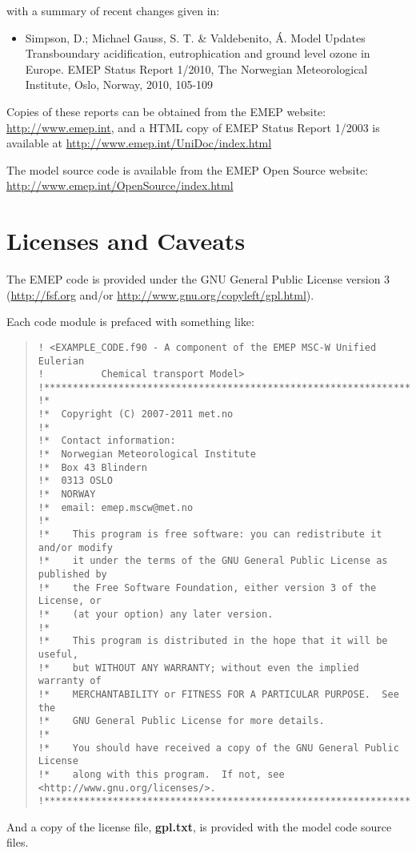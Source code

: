 with a summary of recent changes given in:
\begin{itemize}
\item
Simpson, D.; Michael Gauss, S. T. \& Valdebenito, \'A. Model Updates Transboundary acidification, eutrophication and ground level ozone in Europe. EMEP Status Report 1/2010, The Norwegian Meteorological Institute, Oslo, Norway, 2010, 105-109
\end{itemize}


 Copies of these reports can be obtained from the EMEP website: \\
\url{http://www.emep.int}, and a HTML copy of EMEP Status Report
1/2003 is
available at 
\url{http://www.emep.int/UniDoc/index.html}

The model source code is available from the  EMEP Open Source
  website:\\ \url{http://www.emep.int/OpenSource/index.html}

\newpage

\section{Licenses and Caveats}

The EMEP code is provided under the GNU General Public License version 3
(\url{http://fsf.org} and/or
\url{http://www.gnu.org/copyleft/gpl.html}).

Each code module is prefaced with something like:
\begin{quote}
\begin{small}
\begin{verbatim}
! <EXAMPLE_CODE.f90 - A component of the EMEP MSC-W Unified Eulerian
!          Chemical transport Model>
!*****************************************************************************!
!*
!*  Copyright (C) 2007-2011 met.no
!*
!*  Contact information:
!*  Norwegian Meteorological Institute
!*  Box 43 Blindern
!*  0313 OSLO
!*  NORWAY
!*  email: emep.mscw@met.no
!*
!*    This program is free software: you can redistribute it and/or modify
!*    it under the terms of the GNU General Public License as published by
!*    the Free Software Foundation, either version 3 of the License, or
!*    (at your option) any later version.
!*
!*    This program is distributed in the hope that it will be useful,
!*    but WITHOUT ANY WARRANTY; without even the implied warranty of
!*    MERCHANTABILITY or FITNESS FOR A PARTICULAR PURPOSE.  See the
!*    GNU General Public License for more details.
!*
!*    You should have received a copy of the GNU General Public License
!*    along with this program.  If not, see <http://www.gnu.org/licenses/>.
!*****************************************************************************!
\end{verbatim}
\end{small}
\end{quote}
And a copy of the license file, {\bf gpl.txt}, is provided with the
model code source files.

